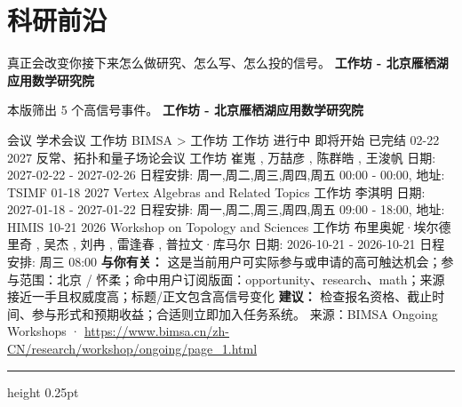 \documentclass[10.5pt]{ctexart}
\begin{document}
\section*{科研前沿}
{\color{ormuted} 真正会改变你接下来怎么做研究、怎么写、怎么投的信号。}
\vspace{2mm}
{\LARGE\bfseries 工作坊 - 北京雁栖湖应用数学研究院}\par
\vspace{1mm}
{\color{ormuted} 本版筛出 5 个高信号事件。}
\vspace{3mm}
{\Large\bfseries 工作坊 - 北京雁栖湖应用数学研究院}\par
会议 学术会议 工作坊 BIMSA > 工作坊 工作坊 进行中 即将开始 已完结 02-22 2027 反常、拓扑和量子场论会议 工作坊 崔嵬 , 万喆彦 , 陈群皓 , 王浚帆 日期: 2027-02-22 - 2027-02-26 日程安排: 周一,周二,周三,周四,周五 00:00 - 00:00, 地址: TSIMF 01-18 2027 Vertex Algebras and Related Topics 工作坊 李淇明 日期: 2027-01-18 - 2027-01-22 日程安排: 周一,周二,周三,周四,周五 09:00 - 18:00, 地址: HIMIS 10-21 2026 Workshop on Topology and Sciences 工作坊 布里奥妮·埃尔德里奇 , 吴杰 , 刘冉 , 雷逢春 , 普拉文·库马尔 日期: 2026-10-21 - 2026-10-21 日程安排: 周三 08:00
\textbf{与你有关：} 这是当前用户可实际参与或申请的高可触达机会；参与范围：北京 / 怀柔；命中用户订阅版面：opportunity、research、math；来源接近一手且权威度高；标题/正文包含高信号变化
\textbf{建议：} 检查报名资格、截止时间、参与形式和预期收益；合适则立即加入任务系统。
{\footnotesize\color{ormuted} 来源：BIMSA Ongoing Workshops · \url{https://www.bimsa.cn/zh-CN/research/workshop/ongoing/page_1.html}}
\vspace{4mm}
\hrule height 0.25pt
\vspace{3mm}
\end{document}
